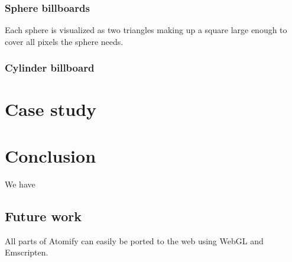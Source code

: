 \documentclass[aps,pre,twocolumn,letterpaper,floatfix,showpacs]{revtex4}
\begin{document}
\subsubsection*{Sphere billboards}
Each sphere is visualized as two triangles making up a square large enough to cover all pixels the sphere needs. 

\subsubsection*{Cylinder billboard}

\section{Case study}


\section{Conclusion}
We have

\subsection{Future work}
All parts of Atomify can easily be ported to the web using WebGL and Emscripten. 



\end{document}
